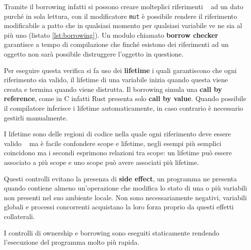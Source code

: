 \documentclass[Lau,binding=0.6cm]{sapthesis}
\newcommand{\textcode}[1]{\colorbox{backcolour}{\texttt{#1}}}
\begin{document}
Tramite il borrowing infatti si possono creare molteplici  riferimenti ~\cite[4.2]{rust:language} ad un dato purché in sola lettura, con il modificatore \textcode{mut} è possibile rendere il riferimento modificabile a patto che in qualsiasi momento per qualsiasi variabile ve ne sia al più uno (listato \ref{lst:borrowing}).
Un modulo chiamato \textbf{borrow checker} garantisce a tempo di compilazione che finché esistono dei riferimenti ad un oggetto non sarà possibile distruggere l'oggetto in questione.



Per eseguire questa verifica si fa uso dei \textbf{lifetime} i quali garantiscono che ogni riferimento sia valido, il lifetime di una variabile inizia quando questa viene creata e termina quando viene distrutta.
Il borrowing simula una \textbf{call by reference}, come in C infatti Rust presenta solo \textbf{call by value}.
Quando possibile il compilatore inferisce i lifetime automaticamente, in caso contrario è necessario gestirli manualmente.

I lifetime sono delle regioni di codice nella quale ogni riferimento deve essere valido ~\cite[3.3]{rust:rustonomicon} ma è facile confondere scope e lifetime, negli esempi più semplici coincidono ma i secondi esprimono relazioni tra scope: un lifetime può essere associato a più scope e uno scope può avere associati più lifetime. 

Questi controlli evitano la presenza di \textbf{side effect}, un programma ne presenta quando contiene almeno un'operazione che modifica lo stato di una o più variabili non presenti nel suo ambiente locale. 
Non sono necessariamente negativi, variabili globali e processi concorrenti acquistano la loro forza proprio da questi effetti collaterali.

I controlli di ownership e borrowing sono eseguiti staticamente rendendo l'esecuzione del programma molto più rapida.
\end{document}
